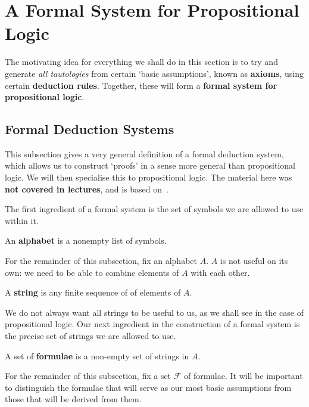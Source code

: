 \section{A Formal System for Propositional Logic}\label{Ch1:Sec:1_2}

The motivating idea for everything we shall do in this section is to try and generate \textit{all tautologies} from certain `basic assumptions', known as \textbf{axioms}, using certain \textbf{deduction rules}. Together, these will form a \textbf{formal system for propositional logic}.

\subsection{Formal Deduction Systems}

This subsection gives a very general definition of a formal deduction system, which allows us to construct `proofs' in a sense more general than propositional logic. We will then specialise this to propositional logic. The material here was \textbf{not covered in lectures}, and is based on~\cite[Definition 1.2.1]{LecNotes2018}.

The first ingredient of a formal system is the set of symbols we are allowed to use within it.

\begin{boxdefinition}[Alphabet]
    An \textbf{alphabet} is a nonempty list of symbols.
\end{boxdefinition}

For the remainder of this subsection, fix an alphabet $A$. $A$ is not useful on its own: we need to be able to combine elements of $A$ with each other.

\begin{boxdefinition}[Strings]
    A \textbf{string} is any finite sequence of of elements of $A$.
\end{boxdefinition}

We do not always want all strings to be useful to us, as we shall see in the case of propositional logic. Our next ingredient in the construction of a formal system is the precise set of strings we are allowed to use.

\begin{boxdefinition}[Formulae]
    A set of \textbf{formulae} is a non-empty set of strings in $A$.
\end{boxdefinition}

For the remainder of this subsection, fix a set $\mathcal{F}$ of formulae. It will be important to distinguish the formulae that will serve as our most basic assumptions from those that will be derived from them.

